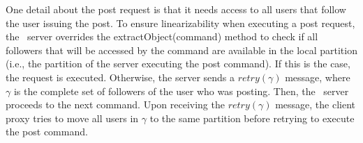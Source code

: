 
One detail about the post request is that it needs access to all users that follow the user issuing the post.
To ensure linearizability when executing a post request, the \appname\ server overrides the extractObject(command) method to check if all followers that will be accessed by the command are available in the local partition (i.e., the partition of the server executing the post command).
If this is the case, the request is executed.
Otherwise, the server sends a $retry(\gamma)$ message, where $\gamma$ is the complete set of followers of the user who was posting.
Then, the \appname\ server proceeds to the next command.
Upon receiving the $retry(\gamma)$ message, the client proxy tries to move all users in $\gamma$ to the same partition before retrying to execute the post command.
